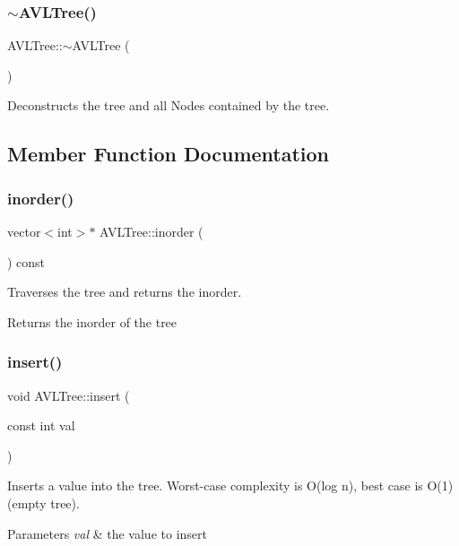 \subsubsection{\texorpdfstring{$\sim$\+A\+V\+L\+Tree()}{~AVLTree()}}
{\footnotesize\ttfamily A\+V\+L\+Tree\+::$\sim$\+A\+V\+L\+Tree (\begin{DoxyParamCaption}{ }\end{DoxyParamCaption})}

Deconstructs the tree and all Nodes contained by the tree. 

\subsection{Member Function Documentation}
\mbox{\label{classAVLTree_ac6cb3c9545647c06b037df91df935496}} 
\subsubsection{\texorpdfstring{inorder()}{inorder()}}
{\footnotesize\ttfamily vector$<$int$>$$\ast$ A\+V\+L\+Tree\+::inorder (\begin{DoxyParamCaption}{ }\end{DoxyParamCaption}) const}

Traverses the tree and returns the inorder.

\begin{DoxyReturn}{Returns}
the inorder of the tree 
\end{DoxyReturn}
\mbox{\label{classAVLTree_aae724d67fd69ce8dec164980d33e7c69}} 
\subsubsection{\texorpdfstring{insert()}{insert()}}
{\footnotesize\ttfamily void A\+V\+L\+Tree\+::insert (\begin{DoxyParamCaption}\item[{const int}]{val }\end{DoxyParamCaption})}

Inserts a value into the tree. Worst-\/case complexity is O(log n), best case is O(1) (empty tree).


\begin{DoxyParams}{Parameters}
{\em val} & the value to insert \\
\hline
\end{DoxyParams}
\mbox{\label{classAVLTree_a7d27a3906ddc72ccb8848bd6a310f24e}} 
